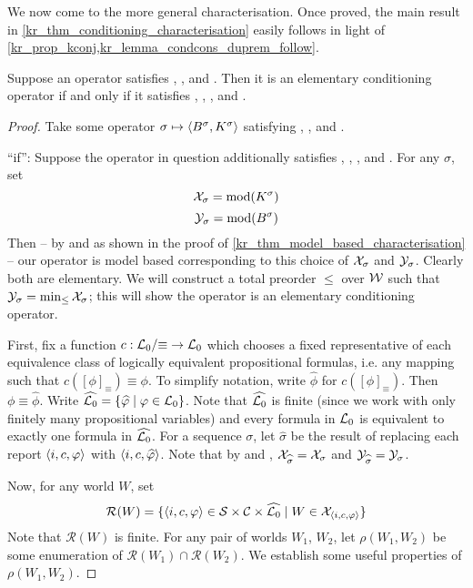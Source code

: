 We now come to the more general characterisation. Once proved, the main result
in \cref{kr_thm_conditioning_characterisation} easily follows in light of
\cref{kr_prop_kconj,kr_lemma_condcons_duprem_follow}.

\begin{proposition}
    \label{kr_prop_conditioning_pre_characterisation}
    Suppose an operator satisfies \closure{}, \containment{},
    \kconj{} and \equivpost{}. Then it is an elementary
    conditioning operator if and only if it satisfies \rearr{},
    \duprem{}, \condcons{},
    \incvac{} and \acyc{}.
\end{proposition}

\begin{proof}

Take some operator $\sigma \mapsto \langle {B^\sigma, K^\sigma} \rangle$ satisfying
\closure{}, \containment{}, \kconj{} and
\equivpost{}.

``if'': Suppose the operator in question additionally satisfies
\rearr{}, \duprem{}, \condcons{},
\incvac{} and \acyc{}. For any $\sigma$, set
%
\[ \mathcal{X}_\sigma = \operatorname{mod}(K^\sigma) \] \[ \mathcal{Y}_\sigma = \operatorname{mod}(B^\sigma) \]
%
Then -- by \closure{} and \containment{} as shown in the proof of
\cref{kr_thm_model_based_characterisation} -- our operator is model based
corresponding to this choice of $\mathcal{X}_\sigma$ and $\mathcal{Y}_\sigma$. Clearly both are
elementary. We will construct a total preorder $\le$ over $\mathcal{W}$ such that
$\mathcal{Y}_\sigma = \min_{\le}{\mathcal{X}_\sigma}$; this will show the operator is an
elementary conditioning operator.

First, fix a function $c: \mathcal{L}{}_0 / {\equiv} \to \mathcal{L}{}_0$ which chooses a fixed
representative of each equivalence class of logically equivalent propositional
formulas, i.e. any mapping such that $c([\phi]_{\equiv}) \equiv \phi$. To
simplify notation, write $\widehat{\phi}$ for $c([\phi]_{\equiv})$. Then $\phi
\equiv \widehat{\phi}$. Write $\widehat{\mathcal{L}{}_0} = \{\widehat{\varphi} \mid \varphi
\in \mathcal{L}{}_0\}$.  Note that $\widehat{\mathcal{L}{}_0}$ is finite (since we work with only
finitely many propositional variables) and every formula in $\mathcal{L}{}_0$ is
equivalent to exactly one formula in $\widehat{\mathcal{L}{}_0}$. For a sequence
$\sigma$, let $\widehat{\sigma}$ be the result of replacing each report
$\langle {i, c, \varphi} \rangle$ with $\langle {i, c, \widehat{\varphi}} \rangle$. Note that by
\rearr{} and \equivpost{}, $\mathcal{X}_{\widehat{\sigma}} =
\mathcal{X}_\sigma$ and $\mathcal{Y}_{\widehat{\sigma}} = \mathcal{Y}_\sigma$.

Now, for any world $W$, set
\newcommand{\reports}{\mathcal{R}}
\[
    \reports(W)
    = \{
        \tuple{i, c, \phi}
        \in \srcs \times \C \times \widehat{\lprop}
        \mid
        W \in \X_{\tuple{i, c, \phi}}
    \}
\]
Note that $\reports(W)$ is finite. For any pair of worlds $W_1$, $W_2$, let
$\rho(W_1, W_2)$ be some enumeration of $\reports(W_1) \cap \reports(W_2)$. We
establish some useful properties of $\rho(W_1, W_2)$.


\end{proof}

